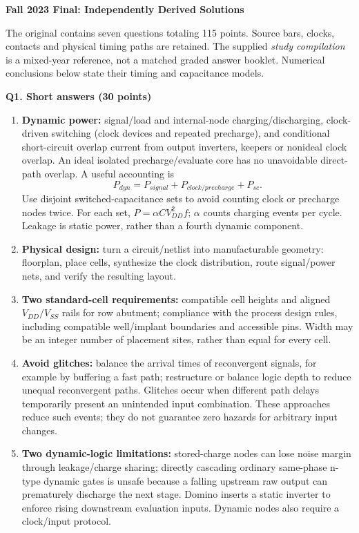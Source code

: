 \documentclass[10pt]{article}
\newcommand{\qheading}[1]{\par\medskip\textbf{#1}\par}
\begin{document}
\begin{center}{\large\bfseries Fall 2023 Final: Independently Derived Solutions}\end{center}
The original contains seven questions totaling 115 points. Source bars, clocks, contacts and physical timing paths are retained. The supplied \emph{study compilation} is a mixed-year reference, not a matched graded answer booklet. Numerical conclusions below state their timing and capacitance models.
\qheading{Q1. Short answers (30 points)}
\begin{enumerate}[label=(\alph*),leftmargin=7mm,itemsep=5pt]
\item \textbf{Dynamic power:} signal/load and internal-node charging/discharging, clock-driven switching (clock devices and repeated precharge), and conditional short-circuit overlap current from output inverters, keepers or nonideal clock overlap. An ideal isolated precharge/evaluate core has no unavoidable direct-path overlap. A useful accounting is
\[
P_{dyn}=P_{signal}+P_{clock/precharge}+P_{sc}.
\]
Use disjoint switched-capacitance sets to avoid counting clock or precharge nodes twice. For each set, $P=\alpha C V_{DD}^{2}f$; $\alpha$ counts charging events per cycle. Leakage is static power, rather than a fourth dynamic component.
\item \textbf{Physical design:} turn a circuit/netlist into manufacturable geometry: floorplan, place cells, synthesize the clock distribution, route signal/power nets, and verify the resulting layout.
\item \textbf{Two standard-cell requirements:} compatible cell heights and aligned $V_{DD}/V_{SS}$ rails for row abutment; compliance with the process design rules, including compatible well/implant boundaries and accessible pins. Width may be an integer number of placement sites, rather than equal for every cell.
\item \textbf{Avoid glitches:} balance the arrival times of reconvergent signals, for example by buffering a fast path; restructure or balance logic depth to reduce unequal reconvergent paths. Glitches occur when different path delays temporarily present an unintended input combination. These approaches reduce such events; they do not guarantee zero hazards for arbitrary input changes.
\item \textbf{Two dynamic-logic limitations:} stored-charge nodes can lose noise margin through leakage/charge sharing; directly cascading ordinary same-phase n-type dynamic gates is unsafe because a falling upstream raw output can prematurely discharge the next stage. Domino inserts a static inverter to enforce rising downstream evaluation inputs. Dynamic nodes also require a clock/input protocol.

\end{enumerate}
\end{document}
